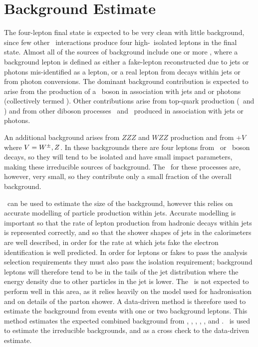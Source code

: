 \graphicspath{{Chapters/BackgroundEstimate/Figures/}}
\chapter{Background Estimate}
\label{chap:BackgroundEstimate}

The four-lepton final state is expected to be very clean with little
background, since few other \sm\ interactions produce four high-\pt\ isolated leptons
in the final state. Almost all of the sources of background include one or more
, where a background
lepton is defined as either a fake-lepton reconstructed due to jets or
photons mis-identified as a lepton, or a real lepton from decays within jets or
from photon conversions.
The dominant background contribution is expected to arise from the production of
a \Z\ boson in
association with jets and or photons (collectively termed \ZX). Other
contributions arise from top-quark production (\ttbar\ and \singletop) and from
other diboson processes \WW\ and \WZ\ produced in association with jets or
photons.

An additional background arises from $ZZZ$ and $WZZ$ production
and from \ttbar+$V$ where $V=W^{\pm},Z$. In these backgrounds there are four leptons
from \W\ or \Z\ boson decays, so they will tend to be isolated and have small
impact parameters, making these irreducible sources of background.
The \cx\ for these processes are, however, very small, so they contribute only a
small fraction of the overall background. 

\mcsim\ can be used to estimate the size of the background, however this relies
on accurate modelling of particle production within jets. Accurate modelling is
important so that the rate of
lepton production from hadronic decays within jets is represented correctly, and so
that the shower shapes of jets in the calorimeters are well described, in order
for the rate at which jets fake the electron identification is well
predicted. In
order for leptons or fakes to pass the analysis selection requirements they must
also pass the
isolation requirement; background leptons will therefore tend to be in the
tails
of the jet distribution where the energy density due to other particles in the jet
is lower. The \mcsim\ is not expected to
perform well in this area, as it relies heavily on the model used for
hadronisation and on details of the parton shower. A data-driven method is
therefore used to estimate the background from events with one or two background
leptons. This method estimates the expected combined background from \ZX,
\Zgamma, \WW, \WZ, \ttbar, and \singletop. \mcsim\ is used to estimate the
irreducible backgrounds, and as a cross check to the data-driven estimate.

